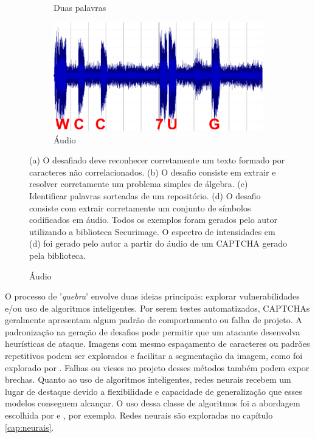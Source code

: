 \begin{figure}[ht]
\begin{subfigure}{.5\textwidth}
		\caption{Duas palavras}
	\end{subfigure}
	\begin{subfigure}{.5\textwidth}
		\centering
		\includegraphics[width=.9\linewidth]{figuras/captcha_audio2.png}
		\caption{Áudio}
	\end{subfigure}
	\small (a) O desafiado deve reconhecer corretamente um texto formado por caracteres não correlacionados. (b) O desafio consiste em extrair e resolver corretamente um problema simples de álgebra. (c) Identificar palavras sorteadas de um repositório. (d) O desafio consiste com extrair corretamente um conjunto de símbolos codificados em áudio. Todos os exemplos foram gerados pelo autor utilizando a biblioteca Securimage. O espectro de intensidades em (d) foi gerado pelo autor a partir do áudio de um CAPTCHA gerado pela biblioteca.
\end{figure}

O processo de '\textit{quebra}' envolve duas ideias principais: explorar vulnerabilidades e/ou uso de algoritmos inteligentes. Por serem testes automatizados, CAPTCHAs geralmente apresentam algum padrão de comportamento ou falha de projeto. A padronização na geração de desafios pode permitir que um atacante desenvolva heurísticas de ataque. Imagens com mesmo espaçamento de caracteres ou padrões repetitivos podem ser explorados e facilitar a segmentação da imagem, como foi explorado por \cite{naivecaptcha}. Falhas ou vieses no projeto desses métodos também podem expor brechas. Quanto ao uso de algoritmos inteligentes, redes neurais recebem um lugar de destaque devido a flexibilidade e capacidade de generalização que esses modelos conseguem alcançar. O uso dessa classe de algoritmos foi a abordagem escolhida por \cite{captcha_break_2013} e \cite{lectures2005HIP}, por exemplo. Redes neurais são exploradas no capítulo \ref{cap:neurais}.

